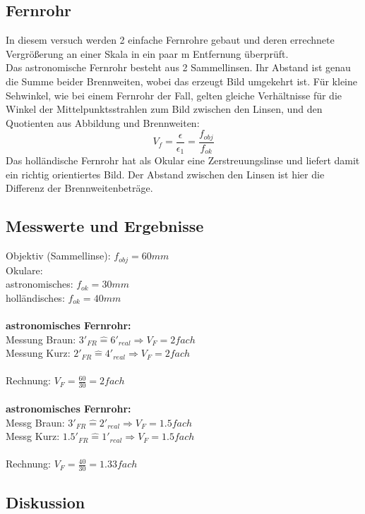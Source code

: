 \documentclass[12pt,a4paper]{article}
\begin{document}
\begin{multicols}{2}
\section{Fernrohr}
In diesem versuch werden 2 einfache Fernrohre gebaut und deren errechnete Vergrößerung an einer Skala in ein paar m Entfernung überprüft.\\
Das astronomische Fernrohr besteht aus 2 Sammellinsen. Ihr Abstand ist genau die Summe beider Brennweiten, wobei das erzeugt Bild umgekehrt ist. Für kleine Sehwinkel, wie bei einem Fernrohr der Fall, gelten gleiche Verhältnisse für die Winkel der Mittelpunktsstrahlen zum Bild zwischen den Linsen, und den Quotienten aus Abbildung und Brennweiten:
$$V_f=\frac{\epsilon}{\epsilon_1}=\frac{f_{obj}}{f_{ok}}$$
Das holländische Fernrohr hat als Okular eine Zerstreuungslinse und liefert damit ein richtig orientiertes Bild. Der Abstand zwischen den Linsen ist hier die Differenz der Brennweitenbeträge.

\subsection{Messwerte und Ergebnisse}
Objektiv (Sammellinse): $f_{obj}=60mm$\\
Okulare:\\
astronomisches: $f_{ok}=30mm$\\
holländisches: $f_{ok}=40mm$\\
\\
\textbf{astronomisches Fernrohr:}\\
Messung Braun: $3'_{FR} \widehat{=} 6'_{real}\Rightarrow V_F=2 fach$\\
Messung Kurz: $2'_{FR} \widehat{=} 4'_{real}\Rightarrow V_F=2 fach$\\
\\
Rechnung: $V_F = \frac{60}{30}=2fach$\\
\\
\textbf{astronomisches Fernrohr:}\\
Messg Braun: $3'_{FR} \widehat{=} 2'_{real}\Rightarrow V_F=1.5fach$\\
Messg Kurz: $1.5'_{FR} \widehat{=} 1'_{real}\Rightarrow V_F=1.5fach$\\
\\
Rechnung: $V_F = \frac{40}{30}=1.33fach$\\




\subsection{Diskussion}


\end{multicols}
\end{document}
